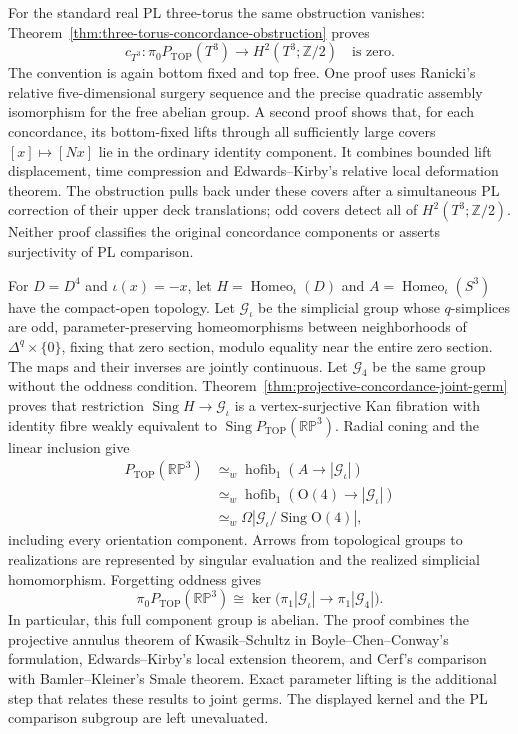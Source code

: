\documentclass[11pt,a4paper]{article}
\theoremstyle{definition}
\begin{document}
For the standard real PL three-torus the same obstruction vanishes:
Theorem~\ref{thm:three-torus-concordance-obstruction} proves
\[
 c_{T^3}:\pi_0P_{\mathrm{TOP}}(T^3)
              \longrightarrow H^2(T^3;\mathbb Z/2)
 \quad\text{is zero}.
\]
The convention is again bottom fixed and top free. One proof uses
Ranicki's relative five-dimensional surgery sequence and the precise
quadratic assembly isomorphism for the free abelian group. A second
proof shows that, for each concordance, its bottom-fixed lifts through
all sufficiently large covers $[x]\mapsto[Nx]$ lie in the ordinary
identity component. It combines bounded lift displacement, time
compression and Edwards--Kirby's relative local deformation theorem.
The obstruction pulls back under these covers after a simultaneous
PL correction of their upper deck translations; odd covers detect
all of $H^2(T^3;\mathbb Z/2)$. Neither proof classifies the original
concordance components or asserts surjectivity of PL comparison.

For $D=D^4$ and $\iota(x)=-x$, let
$H=\operatorname{Homeo}_{\iota}(D)$ and
$A=\operatorname{Homeo}_{\iota}(S^3)$ have the compact-open
topology. Let $\mathcal G_{\iota}$ be the simplicial group
whose $q$-simplices are odd, parameter-preserving homeomorphisms
between neighborhoods of $\Delta^q\times\{0\}$, fixing that
zero section, modulo equality near the entire zero section.
The maps and their inverses are jointly continuous.
Let $\mathcal G_4$ be the same group without the oddness condition.
Theorem~\ref{thm:projective-concordance-joint-germ} proves that
restriction $\operatorname{Sing}H\to\mathcal G_{\iota}$ is
a vertex-surjective Kan fibration with identity fibre weakly
equivalent to $\operatorname{Sing}P_{\mathrm{TOP}}(\mathbb{RP}^3)$.
Radial coning and the linear inclusion give
\[
\begin{split}
P_{\mathrm{TOP}}(\mathbb{RP}^3)
&\simeq_w\operatorname{hofib}_1(A\to|\mathcal G_{\iota}|)\\
&\simeq_w\operatorname{hofib}_1(\mathrm O(4)\to|\mathcal G_{\iota}|)\\
&\simeq_w\Omega|\mathcal G_{\iota}/\operatorname{Sing}\mathrm O(4)|,
\end{split}
\]
including every orientation component. Arrows from topological
groups to realizations are represented by singular evaluation
and the realized simplicial homomorphism. Forgetting oddness gives
\[
\pi_0P_{\mathrm{TOP}}(\mathbb{RP}^3)
\cong\ker\bigl(\pi_1|\mathcal G_{\iota}|
                   \to\pi_1|\mathcal G_4|\bigr).
\]
In particular, this full component group is abelian. The proof
combines the projective annulus theorem of Kwasik--Schultz in
Boyle--Chen--Conway's formulation, Edwards--Kirby's local
extension theorem, and Cerf's comparison with Bamler--Kleiner's
Smale theorem. Exact parameter lifting is the additional step
that relates these results to joint germs. The displayed kernel
and the PL comparison subgroup are left unevaluated.
\end{document}
